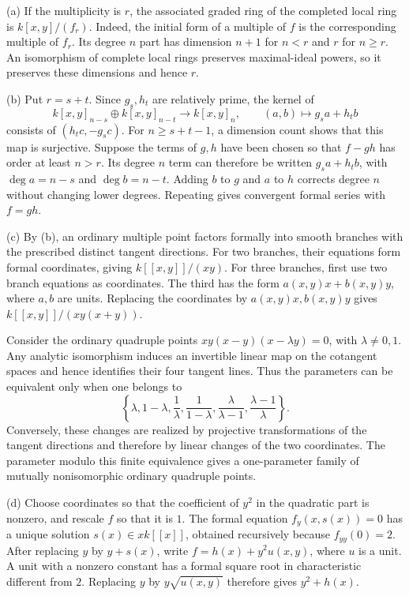 (a) If the multiplicity is $r$, the associated graded ring of the completed local ring is $k[x,y]/(f_r)$. Indeed, the initial form of a multiple of $f$ is the corresponding multiple of $f_r$. Its degree $n$ part has dimension $n+1$ for $n<r$ and $r$ for $n\geq r$. An isomorphism of complete local rings preserves maximal-ideal powers, so it preserves these dimensions and hence $r$.

(b) Put $r=s+t$. Since $g_s,h_t$ are relatively prime, the kernel of
\[k[x,y]_{n-s}\oplus k[x,y]_{n-t}\to k[x,y]_n,\qquad (a,b)\mapsto g_sa+h_tb\]
consists of $(h_tc,-g_sc)$. For $n\geq s+t-1$, a dimension count shows that this map is surjective. Suppose the terms of $g,h$ have been chosen so that $f-gh$ has order at least $n>r$. Its degree $n$ term can therefore be written $g_sa+h_tb$, with $\deg a=n-s$ and $\deg b=n-t$. Adding $b$ to $g$ and $a$ to $h$ corrects degree $n$ without changing lower degrees. Repeating gives convergent formal series with $f=gh$.

(c) By (b), an ordinary multiple point factors formally into smooth branches with the prescribed distinct tangent directions. For two branches, their equations form formal coordinates, giving $k[[x,y]]/(xy)$. For three branches, first use two branch equations as coordinates. The third has the form $a(x,y)x+b(x,y)y$, where $a,b$ are units. Replacing the coordinates by $a(x,y)x,b(x,y)y$ gives $k[[x,y]]/(xy(x+y))$.

Consider the ordinary quadruple points $xy(x-y)(x-\lambda y)=0$, with $\lambda\ne0,1$. Any analytic isomorphism induces an invertible linear map on the cotangent spaces and hence identifies their four tangent lines. Thus the parameters can be equivalent only when one belongs to
\[\left\{\lambda,1-\lambda,\frac1\lambda,\frac1{1-\lambda},\frac\lambda{\lambda-1},\frac{\lambda-1}\lambda\right\}.\]
Conversely, these changes are realized by projective transformations of the tangent directions and therefore by linear changes of the two coordinates. The parameter modulo this finite equivalence gives a one-parameter family of mutually nonisomorphic ordinary quadruple points.

(d) Choose coordinates so that the coefficient of $y^2$ in the quadratic part is nonzero, and rescale $f$ so that it is $1$. The formal equation $f_y(x,s(x))=0$ has a unique solution $s(x)\in xk[[x]]$, obtained recursively because $f_{yy}(0)=2$. After replacing $y$ by $y+s(x)$, write $f=h(x)+y^2u(x,y)$, where $u$ is a unit. A unit with a nonzero constant has a formal square root in characteristic different from $2$. Replacing $y$ by $y\sqrt{u(x,y)}$ therefore gives $y^2+h(x)$.

